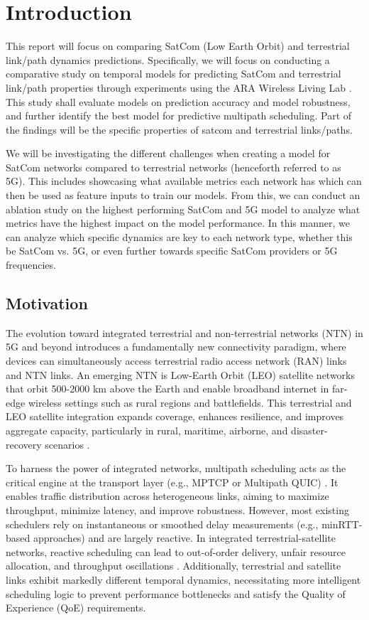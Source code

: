 \documentclass[12pt]{article}
\begin{document}
\newpage
\tableofcontents
\newpage

\section{Introduction}

This report will focus on comparing SatCom (Low Earth Orbit) and terrestrial link/path dynamics predictions. Specifically, we will focus on conducting a comparative study on temporal models for predicting SatCom and terrestrial link/path properties through experiments using the ARA Wireless Living Lab \cite{islam_design_2024}. This study shall evaluate models on prediction accuracy and model robustness, and further identify the best model for predictive multipath scheduling. Part of the findings will be the specific properties of satcom and terrestrial links/paths.

We will be investigating the different challenges when creating a model for SatCom networks compared to terrestrial networks (henceforth referred to as 5G). This includes showcasing what available metrics each network has which can then be used as feature inputs to train our models. From this, we can conduct an ablation study on the highest performing SatCom and 5G model to analyze what metrics have the highest impact on the model performance. In this manner, we can analyze which specific dynamics are key to each network type, whether this be SatCom vs. 5G, or even further towards specific SatCom providers or 5G frequencies. 


\subsection{Motivation}
The evolution toward integrated terrestrial and non-terrestrial networks (NTN) in 5G and beyond introduces a fundamentally new connectivity paradigm, where devices can simultaneously access terrestrial radio access network (RAN) links and NTN links. An emerging NTN is Low-Earth Orbit (LEO) satellite networks that orbit 500-2000 km above the Earth and enable broadband internet in far-edge wireless settings such as rural regions and battlefields. This terrestrial and LEO satellite integration expands coverage, enhances resilience, and improves aggregate capacity, particularly in rural, maritime, airborne, and disaster-recovery scenarios \cite{alcs}. 

To harness the power of integrated networks, multipath scheduling acts as the critical engine at the transport layer (e.g., MPTCP or Multipath QUIC) \cite{3gpp2024atsss}. It enables traffic distribution across heterogeneous links, aiming to maximize throughput, minimize latency, and improve robustness. However, most existing schedulers rely on instantaneous or smoothed delay measurements (e.g., minRTT-based approaches) and are largely reactive. In integrated terrestrial-satellite networks, reactive scheduling can lead to out-of-order delivery, unfair resource allocation, and throughput oscillations \cite{mams}. Additionally, terrestrial and satellite links exhibit markedly different temporal dynamics, necessitating more intelligent scheduling logic to prevent performance bottlenecks and satisfy the Quality of Experience (QoE) requirements.
\end{document}

